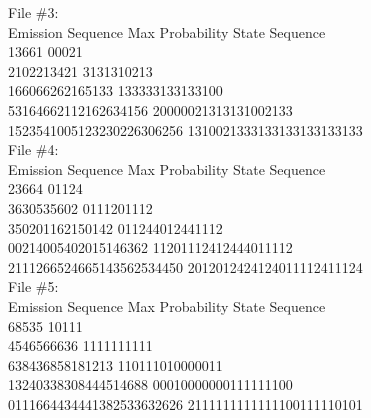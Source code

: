 \begin{subsolution}
{File \#3:\\
Emission Sequence      \text{ }       Max Probability State Sequence\\
13661                  \text{ }       00021\\
2102213421           \text{ }         3131310213\\
166066262165133         \text{ }      133333133133100\\
53164662112162634156       \text{ }   20000021313131002133\\
1523541005123230226306256   \text{ }  1310021333133133133133133\\


File \#4:\\
Emission Sequence   \text{ }          Max Probability State Sequence\\
23664                \text{ }         01124\\
3630535602         \text{ }           0111201112\\
350201162150142         \text{ }      011244012441112\\
00214005402015146362      \text{ }    11201112412444011112\\
2111266524665143562534450   \text{ }  2012012424124011112411124\\


File \#5:\\
Emission Sequence        \text{ }     Max Probability State Sequence\\
68535                 \text{ }        10111\\
4546566636             \text{ }       1111111111\\
638436858181213     \text{ }          110111010000011\\
13240338308444514688     \text{ }     00010000000111111100\\
0111664434441382533632626  \text{ }   2111111111111100111110101
}\end{subsolution}
\clearpage

